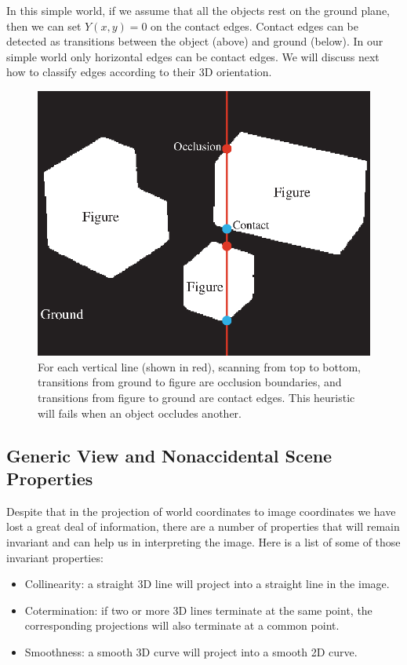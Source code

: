 In this simple world, if we assume that all the objects rest on the ground plane, then we can set $Y(x,y)=0$ on the contact edges.
Contact edges can be detected as transitions between the object (above) and ground (below). In our simple world only horizontal edges can be contact edges. We will discuss next how to classify edges according to their 3D orientation.


\begin{figure}
\centerline{
\includegraphics[width=.5\linewidth]{figures/simplesystem/ground_figure_points.eps}
} 
\caption{For each vertical line (shown in red), scanning from top to bottom, transitions from ground to figure are occlusion boundaries, and transitions from figure to ground are contact edges. This heuristic will fails when an object occludes another.} 
\label{fig:ground_figure_points}
\end{figure}

\subsection{Generic View and Nonaccidental Scene Properties}

Despite that in the projection of world coordinates to image coordinates we have lost a great deal of information, there are a number of properties that will remain invariant and can help us in interpreting the image. Here is a list of some of those invariant properties:
\begin{itemize}
\item Collinearity: a straight 3D line will project into a straight line in the image.
\item Cotermination: if two or more 3D lines terminate at the same point, the corresponding projections will also terminate at a common point. 
\item Smoothness: a smooth 3D curve will project into a smooth 2D curve.
\end{itemize}

